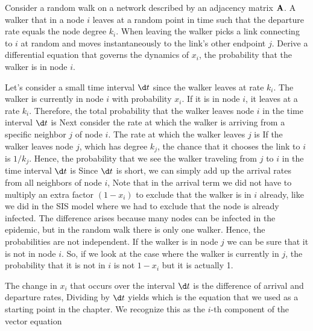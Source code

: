 Consider a random walk on a network described by an adjacency matrix $\bf A$. A walker that in a node $i$ leaves at a random point in time such that the departure rate equals the node degree $k_i$. When leaving the walker picks a link connecting to $i$ at random and moves instantaneously to the link's other endpoint $j$. Derive a differential equation that governs the dynamics of $x_i$, the probability that the walker is in node $i$.

\solution 
Let's consider a small time interval $\d t$ since the walker leaves at rate $k_i$.
The walker is currently in node $i$ with probability $x_i$. If it is in node $i$, it leaves at a rate $k_i$. Therefore, the total probability that the walker leaves node $i$ in the time interval $\d t$ is 
Next consider the rate at which the walker is arriving from a specific neighbor $j$ of node $i$. The rate at which the walker leaves $j$ is 
If the walker leaves node $j$, which has degree $k_j$, the chance that it chooses the link to $i$ is $1/k_j$. Hence, the probability that we see the walker traveling from $j$ to $i$ in the time interval $\d t$ is
Since $\d t$ is short, we can simply add up the arrival rates from all neighbors of node $i$, 
Note that in the arrival term we did not have to multiply an extra factor $(1-x_i)$ to exclude that the walker is in $i$ already, like we did in the SIS model where we had to exclude that the node is already infected. The difference arises because many nodes can be infected in the epidemic, but in the random walk there is only one walker. Hence, the probabilities are not independent. If the walker is in node $j$ we can be sure that it is not in node $i$. So, if we look at the case where the walker is currently in $j$, the probability that it is not in $i$ is not $1-x_i$ but it is actually 1.

The change in $x_i$ that occurs over the interval $\d t$ is the difference of arrival and departure rates,
Dividing by $\d t$ yields
which is the equation that we used as a starting point in the chapter. We recognize this as the $i$-th component of the vector equation 

